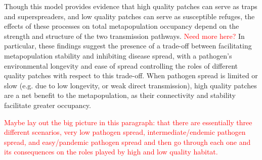 \documentclass{svjour3}
\begin{document}
%

Though this model provides evidence that high quality patches can serve as traps and superspreaders, and low quality patches can serve as susceptible refuges, the effects of these processes on total metapopulation occupancy depend on the strength and structure of the two transmission pathways.  \textcolor{red}{Need more here?}  In particular, these findings suggest the presence of a trade-off between facilitating metapopulation stability and inhibiting disease spread, with a pathogen's environmental longevity and ease of spread controlling the roles of different quality patches with respect to this trade-off.  When pathogen spread is limited or slow (e.g. due to low longevity, or weak direct transmission), high quality patches are a net benefit to the metapopulation, as their connectivity and stability facilitate greater occupancy.  

\textcolor{red}{Maybe lay out the big picture in this paragraph: that there are essentially three different scenarios, very low pathogen spread, intermediate/endemic pathogen spread, and easy/pandemic pathogen spread and then go through each one and its consequences on the roles played by high and low quality habitat.}
\end{document}
